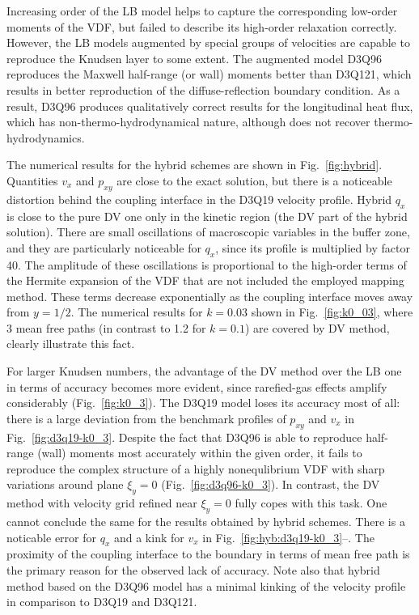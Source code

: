 \documentclass{elsarticle} %
\begin{document}
Increasing order of the LB model helps to capture the corresponding low-order moments of the VDF,
but failed to describe its high-order relaxation correctly.
However, the LB models augmented by special groups of velocities are capable to reproduce the Knudsen layer to some extent.
The augmented model D3Q96 reproduces the Maxwell half-range (or wall) moments better than D3Q121,
which results in better reproduction of the diffuse-reflection boundary condition.
As a result, D3Q96 produces qualitatively correct results for the longitudinal heat flux,
which has non-thermo-hydrodynamical nature, although does not recover thermo-hydrodynamics.

The numerical results for the hybrid schemes are shown in Fig.~\ref{fig:hybrid}.
Quantities \(v_x\) and \(p_{xy}\) are close to the exact solution,
but there is a noticeable distortion behind the coupling interface in the D3Q19 velocity profile.
Hybrid \(q_x\) is close to the pure DV one only in the kinetic region (the DV part of the hybrid solution).
There are small oscillations of macroscopic variables in the buffer zone,
and they are particularly noticeable for \(q_x\), since its profile is multiplied by factor 40.
The amplitude of these oscillations is proportional to the high-order terms of the Hermite expansion of the VDF
that are not included the employed mapping method.
These terms decrease exponentially as the coupling interface moves away from \(y=1/2\).
The numerical results for \(k=0.03\) shown in Fig.~\ref{fig:k0_03},
where 3 mean free paths (in contrast to 1.2 for \(k=0.1\)) are covered by DV method, clearly illustrate this fact.

For larger Knudsen numbers, the advantage of the DV method over the LB one in terms of accuracy becomes more evident,
since rarefied-gas effects amplify considerably (Fig.~\ref{fig:k0_3}).
The D3Q19 model loses its accuracy most of all:
there is a large deviation from the benchmark profiles of \(p_{xy}\) and \(v_x\) in Fig.~\ref{fig:d3q19-k0_3}.
Despite the fact that D3Q96 is able to reproduce half-range (wall) moments most accurately within the given order,
it fails to reproduce the complex structure of a highly nonequlibrium VDF with sharp variations
around plane \(\xi_y=0\) (Fig.~\ref{fig:d3q96-k0_3}).
In contrast, the DV method with velocity grid refined near \(\xi_y=0\) fully copes with this task.
One cannot conclude the same for the results obtained by hybrid schemes.
There is a noticable error for \(q_x\) and a kink for \(v_x\) in Fig.~\ref{fig:hyb:d3q19-k0_3}--.
The proximity of the coupling interface to the boundary in terms of mean free path is the primary reason
for the observed lack of accuracy. Note also that hybrid method based on the D3Q96 model has a minimal kinking
of the velocity profile in comparison to D3Q19 and D3Q121.
\end{document}
